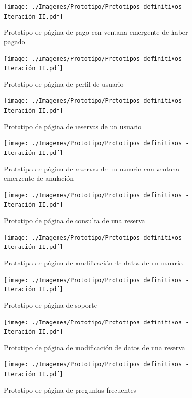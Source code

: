 \begin{figure}[H]
      \centering
      \texttt{[image: ./Imagenes/Prototipo/Prototipos definitivos - Iteración II.pdf]}
      \caption{Prototipo de página de pago con ventana emergente de haber pagado}
      \label{fig:prot2_pago_popup}
\end{figure}

\begin{figure}[H]
      \centering
      \texttt{[image: ./Imagenes/Prototipo/Prototipos definitivos - Iteración II.pdf]}
      \caption{Prototipo de página de perfil de usuario}
      \label{fig:prot2_perfil}
\end{figure}

\begin{figure}[H]
      \centering
      \texttt{[image: ./Imagenes/Prototipo/Prototipos definitivos - Iteración II.pdf]}
      \caption{Prototipo de página de reservas de un usuario}
      \label{fig:prot2_reservas_usuario}
\end{figure}

\begin{figure}[H]
      \centering
      \texttt{[image: ./Imagenes/Prototipo/Prototipos definitivos - Iteración II.pdf]}
      \caption{Prototipo de página de reservas de un usuario con ventana emergente de anulación}
      \label{fig:prot2_reservas_usuario_popup}
\end{figure}

\begin{figure}[H]
      \centering
      \texttt{[image: ./Imagenes/Prototipo/Prototipos definitivos - Iteración II.pdf]}
      \caption{Prototipo de página de consulta de una reserva}
      \label{fig:prot2_reservas_mod}
\end{figure}

\begin{figure}[H]
      \centering
      \texttt{[image: ./Imagenes/Prototipo/Prototipos definitivos - Iteración II.pdf]}
      \caption{Prototipo de página de modificación de datos de un usuario}
      \label{fig:prot2_usuario_mod}
\end{figure}

\begin{figure}[H]
      \centering
      \texttt{[image: ./Imagenes/Prototipo/Prototipos definitivos - Iteración II.pdf]}
      \caption{Prototipo de página de soporte}
      \label{fig:prot2_soporte}
\end{figure}

\begin{figure}[H]
      \centering
      \texttt{[image: ./Imagenes/Prototipo/Prototipos definitivos - Iteración II.pdf]}
      \caption{Prototipo de página de modificación de datos de una reserva}
      \label{fig:prot2_reserva_mod}
\end{figure}

\begin{figure}[H]
      \centering
      \texttt{[image: ./Imagenes/Prototipo/Prototipos definitivos - Iteración II.pdf]}
      \caption{Prototipo de página de preguntas frecuentes}
      \label{fig:prot2_faq}
\end{figure}
